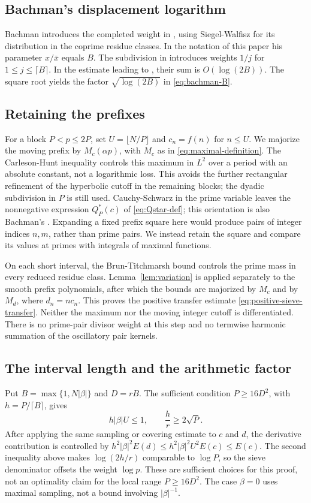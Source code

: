 \documentclass[11pt]{amsart}
\numberwithin{equation}{section}
\numberwithin{figure}{section}
\theoremstyle{definition}
\begin{document}
\subsection{Bachman's displacement logarithm}
Bachman introduces the completed weight in
\cite[equation~(2.7)]{Bachman}, using Siegel-Walfisz for its distribution
in the coprime residue classes. In the notation of this paper his
parameter $x/\bar x$ equals $B$. The subdivision in
\cite[equation~(2.15), p.~50]{Bachman} introduces weights $1/j$ for
$1\le j\le\lceil B\rceil$. In the estimate leading to
\cite[equation~(3.1), p.~51]{Bachman}, their sum is
$O(\log(2B))$. The square root yields the factor
$\sqrt{\log(2B)}$ in \eqref{eq:bachman-B}.

\subsection{Retaining the prefixes}
For a block $P<p\le2P$, set $U=\lfloor N/P\rfloor$ and
$c_n=f(n)$ for $n\le U$. We majorize the moving prefix by
$M_c(\alpha p)$, with $M_c$ as in \eqref{eq:maximal-definition}.
The Carleson-Hunt inequality controls this maximum in $L^2$ over a
period with an absolute constant, not a logarithmic loss. This avoids
the further rectangular refinement of the hyperbolic cutoff in the
remaining blocks; the dyadic subdivision in $P$ is still used.
Cauchy-Schwarz in the prime variable leaves the nonnegative expression
$Q_P^*(c)$ of \eqref{eq:Qstar-def}; this orientation is also Bachman's
\cite[equation~(2.6)]{Bachman}. Expanding a fixed prefix square here
would produce pairs of integer indices $n,m$, rather than prime pairs.
We instead retain the square and compare its values at primes with
integrals of maximal functions.

On each short interval, the Brun-Titchmarsh bound controls the prime
mass in every reduced residue class. Lemma~\ref{lem:variation} is
applied separately to the smooth prefix polynomials, after which the
bounds are majorized by $M_c$ and by $M_d$, where $d_n=nc_n$.
This proves the positive transfer estimate
\eqref{eq:positive-sieve-transfer}. Neither the maximum nor the moving
integer cutoff is differentiated. There is no prime-pair divisor
weight at this step and no termwise harmonic summation of the
oscillatory pair kernels.

\subsection{The interval length and the arithmetic factor}
Put $B=\max\{1,N|\beta|\}$ and $D=rB$. The sufficient condition
$P\ge16D^2$, with $h=P/\lceil B\rceil$, gives
\[
 h|\beta|U\le1,\qquad \frac h r\ge2\sqrt P.
\]
After applying the same sampling or covering estimate to $c$ and $d$,
the derivative contribution is controlled by
$h^2|\beta|^2E(d)\le h^2|\beta|^2U^2E(c)\le E(c)$.
The second inequality above makes $\log(2h/r)$ comparable to
$\log P$, so the sieve denominator offsets the weight $\log p$.
These are sufficient choices for this proof, not an optimality claim
for the local range $P\ge16D^2$. The case $\beta=0$ uses maximal
sampling, not a bound involving $|\beta|^{-1}$.
\end{document}
